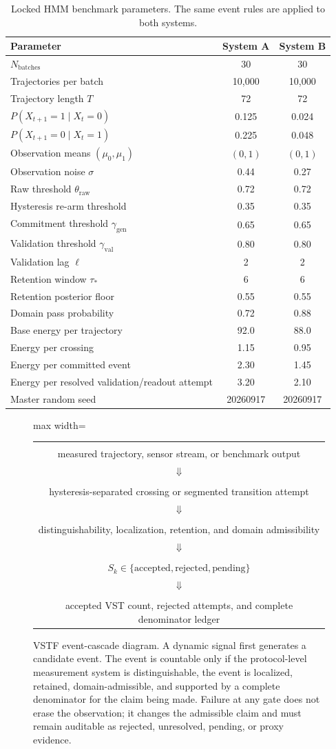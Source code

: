 \documentclass[11pt,a4paper]{article}
\newcommand{\1}{\mathbf{1}}
\newcommand{\VSTFStepBox}[2]{%
  \fbox{\begin{minipage}{0.82\linewidth}
  \centering\textbf{#1}\\[-0.15em]\small #2
  \end{minipage}}%
}
\newcommand{\VSTFEventCascadeFigure}{%
  \begin{adjustbox}{max width=\linewidth}
  \begin{tabular}{c}
  \VSTFStepBox{Raw dynamic signal}{measured trajectory, sensor stream, or benchmark output}\\[0.55em]
  $\Downarrow$\\[-0.1em]
  \VSTFStepBox{Candidate event}{hysteresis-separated crossing or segmented transition attempt}\\[0.55em]
  $\Downarrow$\\[-0.1em]
  \VSTFStepBox{Measurement gates}{distinguishability, localization, retention, and domain admissibility}\\[0.55em]
  $\Downarrow$\\[-0.1em]
  \VSTFStepBox{Outcome status}{$S_k\in\{\mathrm{accepted},\mathrm{rejected},\mathrm{pending}\}$}\\[0.55em]
  $\Downarrow$\\[-0.1em]
  \VSTFStepBox{Claim boundary}{accepted VST count, rejected attempts, and complete denominator ledger}
  \end{tabular}
  \end{adjustbox}
}
\begin{document}
\begin{table}[h]
\centering
\caption{Locked HMM benchmark parameters. The same event rules are applied to both systems.}
\label{tab:hmm-parameters}
\begin{tabular}{lcc}
\toprule
Parameter & System A & System B \\
\midrule
$N_{\mathrm{batches}}$ & 30 & 30 \\
Trajectories per batch & 10,000 & 10,000 \\
Trajectory length $T$ & 72 & 72 \\
$P(X_{t+1}=1\mid X_t=0)$ & 0.125 & 0.024 \\
$P(X_{t+1}=0\mid X_t=1)$ & 0.225 & 0.048 \\
Observation means $(\mu_0,\mu_1)$ & $(0,1)$ & $(0,1)$ \\
Observation noise $\sigma$ & 0.44 & 0.27 \\
Raw threshold $\theta_{\mathrm{raw}}$ & 0.72 & 0.72 \\
Hysteresis re-arm threshold & 0.35 & 0.35 \\
Commitment threshold $\gamma_{\mathrm{gen}}$ & 0.65 & 0.65 \\
Validation threshold $\gamma_{\mathrm{val}}$ & 0.80 & 0.80 \\
Validation lag $\ell$ & 2 & 2 \\
Retention window $\tau_\ast$ & 6 & 6 \\
Retention posterior floor & 0.55 & 0.55 \\
Domain pass probability & 0.72 & 0.88 \\
Base energy per trajectory & 92.0 & 88.0 \\
Energy per crossing & 1.15 & 0.95 \\
Energy per committed event & 2.30 & 1.45 \\
Energy per resolved validation/readout attempt & 3.20 & 2.10 \\
Master random seed & 20260917 & 20260917 \\
\bottomrule
\end{tabular}
\end{table}

\begin{figure}[h]
\centering
\VSTFEventCascadeFigure
\caption{VSTF event-cascade diagram. A dynamic signal first generates a candidate event. The event is countable only if the protocol-level measurement system is distinguishable, the event is localized, retained, domain-admissible, and supported by a complete denominator for the claim being made. Failure at any gate does not erase the observation; it changes the admissible claim and must remain auditable as rejected, unresolved, pending, or proxy evidence.}
\label{fig:event-cascade}
\end{figure}
\end{document}
